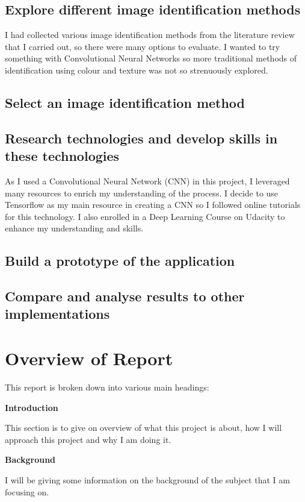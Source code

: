 \subsection*{Explore different image identification methods}
I had collected various image identification methods from the literature review
that I carried out, so there were many options to evaluate.
I wanted to try something with Convolutional Neural Networks so more traditional
methods of identification using colour and texture was not so strenuously explored.

\subsection*{Select an image identification method}

\subsection*{Research technologies and develop skills in these technologies}
As I used a Convolutional Neural Network (CNN) in this project, I leveraged many resources to enrich my understanding of the process.
I decide to use Tensorflow as my main resource in creating a CNN so I followed online tutorials for this technology.
I also enrolled in a Deep Learning Course on Udacity to enhance my understanding and skills.

\subsection*{Build a prototype of the application}

\subsection*{Compare and analyse results to other implementations}


\section{Overview of Report}

This report is broken down into various main headings:

\textbf{Introduction}

This section is to give on overview of what this project is about, how I will approach this project and why I am doing it.

\textbf{Background}

I will be giving some information on the background of the subject that I am focusing on.

